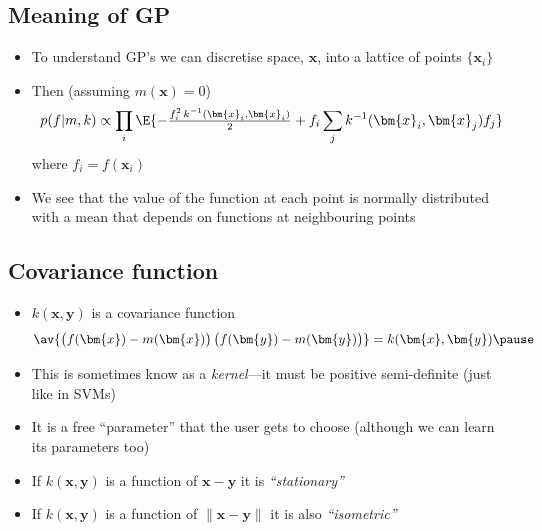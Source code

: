 
\begin{slide}
\section[-1]{Meaning of GP}

\begin{PauseHighLight}
  \begin{itemize}
  \item To understand GP's we can discretise space, $\bm{x}$, into a
    lattice of points $\{\bm{x}_i\}$\pause
  \item Then (assuming $m(\bm{x})=0$)
    \begin{align*}
      p(f|m,k) \propto \prod_i \E{-\tfrac{f_i^2\, k^{-1}(\bm{x}_i,\bm{x}_i)}{
      2} + f_i  \sum_j
      k^{-1}(\bm{x}_i,\bm{x}_j) f_j}
    \end{align*}
    where $f_i=f(\bm{x}_i)$\pause
  \item We see that the value of the function at each point is normally
    distributed with a mean that depends on functions at neighbouring
    points\pause
  \end{itemize}
\end{PauseHighLight}

\end{slide}




\begin{slide}
\section[-1]{Covariance function}

\begin{PauseHighLight}
  \begin{itemize}
  \item $k(\bm{x},\bm{y})$ is a covariance function
    \begin{align*}
      \av{\left(\strut f(\bm{x})-m(\bm{x})\right)
      \left(\strut f(\bm{y})-m(\bm{y})\right)} = k(\bm{x},\bm{y})\pause
    \end{align*}
  \item This is sometimes know as a \emph{kernel}\pause---it must be positive
    semi-definite\pause{} (just like in SVMs)\pauseb
  \item It is a free ``parameter'' that the user gets to choose (although we
    can learn its parameters too)\pause
  \item If $k(\bm{x},\bm{y})$ is a function of $\bm{x}-\bm{y}$ it is
    \emph{``stationary''}\pause
  \item If $k(\bm{x},\bm{y})$ is a function of $\|\bm{x}-\bm{y}\|$ it is
    also \emph{``isometric''}\pause
  \end{itemize}
\end{PauseHighLight}

\end{slide}

